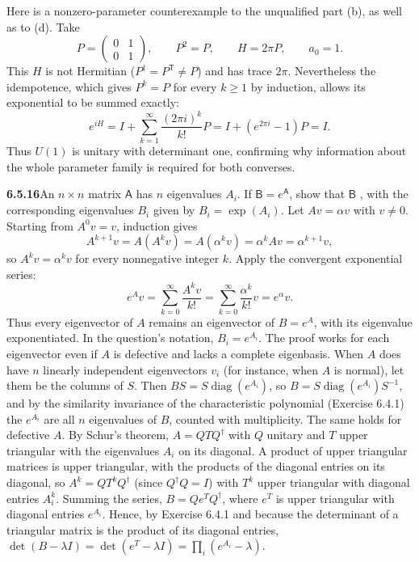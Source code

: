 Here is a nonzero-parameter counterexample to the unqualified part (b),
as well as to (d). Take
\[
P=\begin{pmatrix}0&1\\0&1\end{pmatrix},\qquad P^2=P,
\qquad H=2\pi P,
\qquad a_0=1.
\]
This $H$ is not Hermitian ($P^\dagger=P^{\mathsf T}\ne P$) and has
trace $2\pi$. Nevertheless the idempotence, which gives $P^k=P$ for
every $k\ge1$ by induction, allows its exponential to be summed exactly:
\[
e^{iH}=I+\sum_{k=1}^\infty\frac{(2\pi i)^k}{k!}P
=I+(e^{2\pi i}-1)P=I.
\]
Thus $U(1)$ is unitary with determinant one, confirming why information
about the whole parameter family is required for both converses.

\par\bigskip
\noindent\textbf{6.5.16}\quad An $n\times n$ matrix $\mathsf{A}$ has $n$
eigenvalues $A_{i}$. If $\mathsf{B}=e^{\mathsf{A}}$, show that $\mathsf{B}$
, with the corresponding eigenvalues
$B_{i}$ given by $B_{i}=\exp(A_{i})$.
\solution
Let $Av=\alpha v$ with $v\ne0$. Starting from $A^0v=v$,
induction gives
\[
A^{k+1}v=A(A^kv)=A(\alpha^kv)=\alpha^kAv
=\alpha^{k+1}v,
\]
so $A^kv=\alpha^kv$ for every nonnegative integer $k$.
Apply the convergent exponential series:
\[
e^Av=\sum_{k=0}^\infty\frac{A^kv}{k!}
=\sum_{k=0}^\infty\frac{\alpha^k}{k!}v
=\boxed{e^\alpha v}.
\]
Thus every eigenvector of $A$ remains an eigenvector of $B=e^A$, with
its eigenvalue exponentiated. In the question's notation,
$\boxed{B_i=e^{A_i}}$. The proof works for each eigenvector even if
$A$ is defective and lacks a complete eigenbasis. When $A$ does have
$n$ linearly independent eigenvectors $v_i$ (for instance, when $A$ is
normal), let them be the columns of $S$. Then $BS=S\operatorname{diag}(e^{A_i})$,
so $B=S\operatorname{diag}(e^{A_i})S^{-1}$, and by the similarity
invariance of the characteristic polynomial (Exercise 6.4.1) the
$e^{A_i}$ are all $n$ eigenvalues of $B$, counted with multiplicity.
The same holds for defective $A$. By Schur's theorem, $A=QTQ^\dagger$
with $Q$ unitary and $T$ upper triangular with the eigenvalues $A_i$ on
its diagonal. A product of upper triangular matrices is upper
triangular, with the products of the diagonal entries on its diagonal,
so $A^k=QT^kQ^\dagger$ (since $Q^\dagger Q=I$) with $T^k$ upper
triangular with diagonal entries $A_i^k$. Summing the series,
$B=Qe^TQ^\dagger$, where $e^T$ is upper triangular with diagonal entries
$e^{A_i}$. Hence, by Exercise 6.4.1 and because the determinant of a
triangular matrix is the product of its diagonal entries,
$\det(B-\lambda I)=\det(e^T-\lambda I)=\prod_i(e^{A_i}-\lambda)$.

